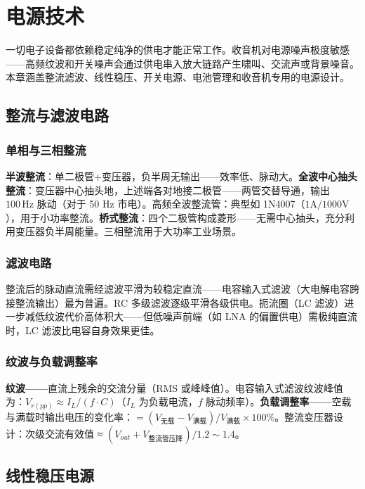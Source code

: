\documentclass[12pt,UTF8]{ctexbook}
\begin{document}
\chapter{电源技术}
\label{chap:power_supply}

一切电子设备都依赖稳定纯净的供电才能正常工作。收音机对电源噪声极度敏感——高频纹波和开关噪声会通过供电串入放大链路产生啸叫、交流声或背景噪音。本章涵盖整流滤波、线性稳压、开关电源、电池管理和收音机专用的电源设计。

\section{整流与滤波电路}
\label{sec:rectifier_filter}

\subsection{单相与三相整流}

\textbf{半波整流}：单二极管+变压器，负半周无输出——效率低、脉动大。\textbf{全波中心抽头整流}：变压器中心抽头地，上述端各对地接二极管——两管交替导通，输出 $100\,\mathrm{Hz}$ 脉动（对于 50 Hz 市电）。高频全波整流管：典型如 1N4007（$1\mathrm{A}/1000\mathrm{V}$），用于小功率整流。\textbf{桥式整流}：四个二极管构成菱形——无需中心抽头，充分利用变压器负半周能量。三相整流用于大功率工业场景。

\subsection{滤波电路}

整流后的脉动直流需经滤波平滑为较稳定直流——电容输入式滤波（大电解电容跨接整流输出）最为普遍。RC 多级滤波逐级平滑各级供电。扼流圈（LC 滤波）进一步减低纹波代价高体积大——但低噪声前端（如 LNA 的偏置供电）需极纯直流时，LC 滤波比电容自身效果更佳。

\subsection{纹波与负载调整率}

\textbf{纹波——}直流上残余的交流分量（RMS 或峰峰值）。电容输入式滤波纹波峰值为：$V_{r(pp)}\approx I_L/(f\cdot C)$（$I_L$ 为负载电流，$f$ 脉动频率）。\textbf{负载调整率——}空载与满载时输出电压的变化率：$= (V_{无载}-V_{满载})/V_{满载} \times 100\%$。整流变压器设计：次级交流有效值 ≈ $(V_{out}+V_{整流管压降})/1.2\sim1.4$。

\section{线性稳压电源}
\label{sec:linear_regulator}
\end{document}
